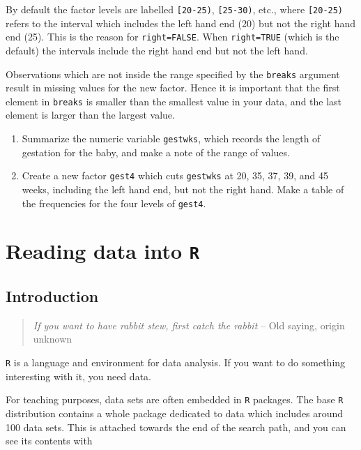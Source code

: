 \documentclass[
]{book}
\begin{document}
By default the factor levels are labelled \texttt{{[}20-25)},
\texttt{{[}25-30)}, etc., where \texttt{{[}20-25)} refers to the interval
which includes the left hand end (20) but not the right hand end
(25). This is the reason for \texttt{right=FALSE}. When \texttt{right=TRUE}
(which is the default) the intervals include the right hand end but
not the left hand.

Observations which are not inside the range specified by the \texttt{breaks}
argument result in missing values for the new factor. Hence it
is important that the first element in \texttt{breaks} is smaller than the
smallest value in your data, and the last element is larger than the
largest value.

\begin{enumerate}
\def\labelenumi{\arabic{enumi}.}
\item
  Summarize the numeric variable \texttt{gestwks}, which records the
  length of gestation for the baby, and make a note of the range of
  values.
\item
  Create a new factor \texttt{gest4} which cuts \texttt{gestwks} at 20,
  35, 37, 39, and 45 weeks, including the left hand end, but not the
  right hand. Make a table of the frequencies for the four levels of \texttt{gest4}.
\end{enumerate}

\chapter{\texorpdfstring{Reading data into \texttt{R}}{Reading data into R}}\label{reading-data-into-r}

\section{Introduction}\label{introduction}

\begin{quote}
\emph{If you want to have rabbit stew, first catch the rabbit} -- Old saying, origin unknown
\end{quote}

\texttt{R} is a language and environment for data analysis. If you
want to do something interesting with it, you need data.

For teaching purposes, data sets are often embedded in \texttt{R}
packages. The base \texttt{R} distribution contains a whole package
dedicated to data which includes around 100 data sets. This is
attached towards the end of the search path, and you can see its
contents with
\end{document}
